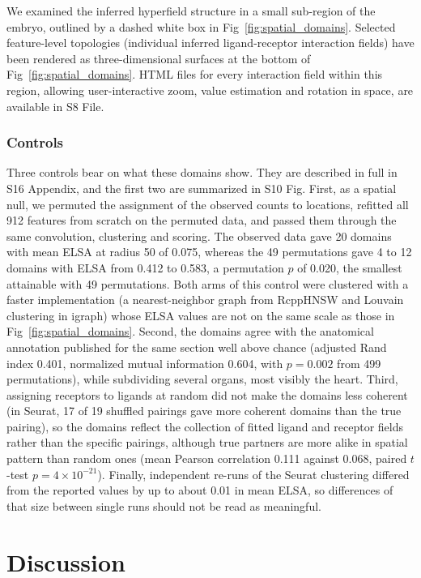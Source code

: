 \documentclass[10pt,letterpaper]{article}
\begin{document}
We examined the inferred hyperfield structure in a small sub-region of the embryo, outlined by a dashed white box in Fig~\ref{fig:spatial_domains}. Selected feature-level topologies (individual inferred ligand-receptor interaction fields) have been rendered as three-dimensional surfaces at the bottom of Fig~\ref{fig:spatial_domains}. HTML files for every interaction field within this region, allowing user-interactive zoom, value estimation and rotation in space, are available in S8 File.

\subsubsection*{Controls}
\label{sec:controls}

Three controls bear on what these domains show. They are described in full in S16 Appendix, and the first two are summarized in S10 Fig. First, as a spatial null, we permuted the assignment of the observed counts to locations, refitted all 912 features from scratch on the permuted data, and passed them through the same convolution, clustering and scoring. The observed data gave 20 domains with mean ELSA at radius 50 of 0.075, whereas the 49 permutations gave 4 to 12 domains with ELSA from 0.412 to 0.583, a permutation $p$ of 0.020, the smallest attainable with 49 permutations. Both arms of this control were clustered with a faster implementation (a nearest-neighbor graph from RcppHNSW and Louvain clustering in igraph) whose ELSA values are not on the same scale as those in Fig~\ref{fig:spatial_domains}. Second, the domains agree with the anatomical annotation published for the same section \cite{Chen2022} well above chance (adjusted Rand index 0.401, normalized mutual information 0.604, with $p = 0.002$ from 499 permutations), while subdividing several organs, most visibly the heart. Third, assigning receptors to ligands at random did not make the domains less coherent (in Seurat, 17 of 19 shuffled pairings gave more coherent domains than the true pairing), so the domains reflect the collection of fitted ligand and receptor fields rather than the specific pairings, although true partners are more alike in spatial pattern than random ones (mean Pearson correlation 0.111 against 0.068, paired $t$-test $p = 4\times10^{-21}$). Finally, independent re-runs of the Seurat clustering differed from the reported values by up to about 0.01 in mean ELSA, so differences of that size between single runs should not be read as meaningful.

\section*{Discussion}\label{sec:discussion}
\end{document}
